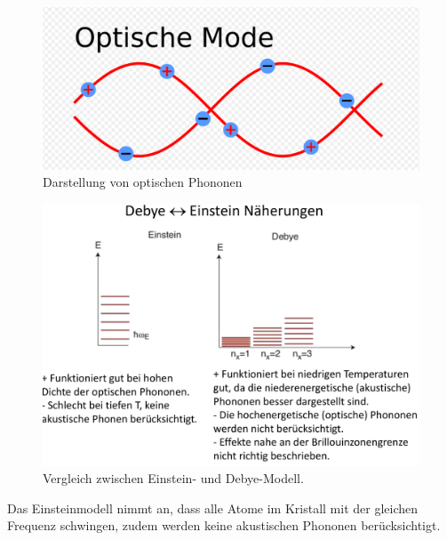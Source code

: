 \begin{itemize}
         \begin{figure}[H]
             \centering
             \begin{samepage}
                 \includegraphics[width=0.8\linewidth]{resources/09-05-2012/opt.PNG}
                 \caption[Optische Wellen Phononen]{Darstellung von optischen Phononen}
                 \label{fig:optische_wellen_phononen}
             \end{samepage}
         \end{figure}

\end{itemize}



\label{q:30}

\begin{figure}[H]  
    \centering
    \includegraphics[width=.8\textwidth]{resources/09-05-2012/q30.png}
    \caption{Vergleich zwischen Einstein- und Debye-Modell.}
\end{figure}

Das Einsteinmodell nimmt an, dass alle Atome im Kristall mit der gleichen Frequenz schwingen, zudem werden keine akustischen Phononen berücksichtigt.

\newpage
